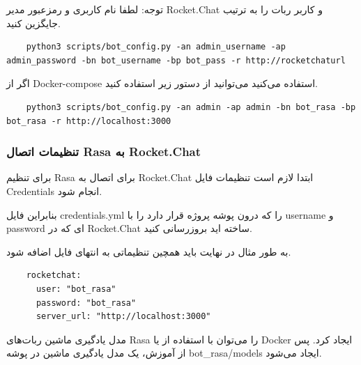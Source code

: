 توجه: لطفا نام کاربری و رمزعبور مدیر Rocket.Chat و کاربر ربات را به ترتیب جایگزین کنید.

\begin{latin}
    \begin{verbatim}
    python3 scripts/bot_config.py -an admin_username -ap admin_password -bn bot_username -bp bot_pass -r http://rocketchaturl
    \end{verbatim}
\end{latin}

اگر از Docker-compose استفاده می‌کنید می‌توانید از دستور زیر استفاده کنید.

\begin{latin}
    \begin{verbatim}
    python3 scripts/bot_config.py -an admin -ap admin -bn bot_rasa -bp bot_rasa -r http://localhost:3000
    \end{verbatim}
\end{latin}


\subsubsection{تنظیمات اتصال Rasa به Rocket.Chat}

برای تنظیم Rasa برای اتصال به Rocket.Chat ابتدا لازم است تنظیمات فایل Credentials انجام شود.

بنابراین فایل credentials.yml را که درون پوشه پروژه قرار دارد را با username و password ای که در Rocket.Chat ساخته اید بروزرسانی کنید.

به طور مثال در نهایت باید همچین تنظیماتی به انتهای فایل اضافه شود.

\begin{latin}
    \begin{verbatim}
    rocketchat:
      user: "bot_rasa"
      password: "bot_rasa"
      server_url: "http://localhost:3000"
    \end{verbatim}
\end{latin}

مدل یادگیری ماشین ربات‌های Rasa را می‌توان با استفاده از  یا Docker ایجاد کرد. پس از آموزش، یک مدل یادگیری ماشین در پوشه bot\_rasa/models ایجاد می‌شود.

